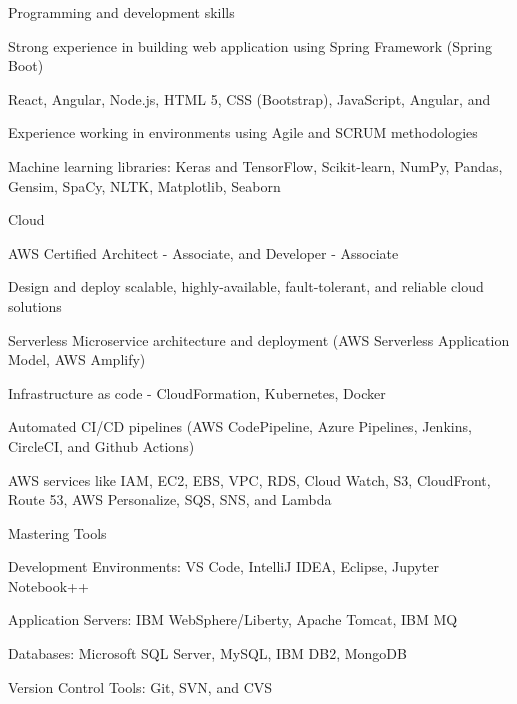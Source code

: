 \vspace{-1em}
\begin{cventries}
  \cventry
    {Programming and development skills}
    {}
    {}
    {}
    {
      \begin{cvitems}
        \item {Strong experience in building web application using Spring Framework (Spring Boot)}
        \item {React, Angular, Node.js, HTML 5, CSS (Bootstrap), JavaScript, Angular, and  }
        \item {Experience working in environments using Agile and SCRUM methodologies}
        \item {Machine learning libraries: Keras and TensorFlow, Scikit-learn, NumPy, Pandas, Gensim, SpaCy, NLTK, Matplotlib, Seaborn }
      \end{cvitems}
    }
    
\vspace{-1em}

    \cventry
    {Cloud}
    {}
    {}
    {}
    {
      \begin{cvitems}
        \item {AWS Certified Architect - Associate, and Developer - Associate }
        \item {Design and deploy scalable, highly-available, fault-tolerant, and reliable cloud solutions}
        \item {Serverless Microservice architecture and deployment (AWS Serverless Application Model, AWS Amplify) }
        \item {Infrastructure as code - CloudFormation, Kubernetes, Docker }
        \item {Automated CI/CD pipelines (AWS CodePipeline, Azure Pipelines, Jenkins, CircleCI, and Github Actions)}
        \item { AWS services like IAM, EC2, EBS, VPC, RDS, Cloud Watch, S3, CloudFront, Route 53, AWS Personalize, SQS, SNS, and Lambda }
      \end{cvitems}
    }
    
\vspace{-1em}

    \cventry
    {Mastering Tools}
    {}
    {}
    {}
    {
      \begin{cvitems}
        \item {Development Environments: VS Code, IntelliJ IDEA, Eclipse, Jupyter Notebook++}
        \item {Application Servers: IBM WebSphere/Liberty, Apache Tomcat, IBM MQ}
        \item {Databases: Microsoft SQL Server, MySQL, IBM DB2, MongoDB}
        \item {Version Control Tools: Git, SVN, and CVS }
      \end{cvitems}
    }
    

\end{cventries}
